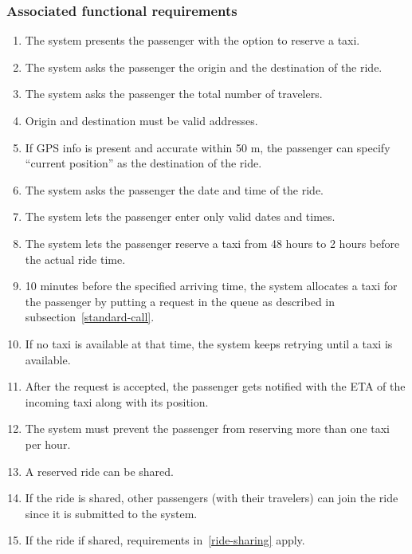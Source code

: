 \subsubsection{Associated functional requirements}
\begin{enumerate}
	\item The system presents the passenger with the option to reserve a taxi.
	\item The system asks the passenger the origin and the destination of the ride.
	\item The system asks the passenger the total number of travelers.
	\item Origin and destination must be valid addresses.
	\item If GPS info is present and accurate within 50 m, the passenger can specify ``current position'' as the destination of the ride.
	\item The system asks the passenger the date and time of the ride.
	\item The system lets the passenger enter only valid dates and times.
	\item The system lets the passenger reserve a taxi from 48 hours to 2 hours before the actual ride time.
	\item 10 minutes before the specified arriving time, the system allocates a taxi for the passenger by putting a request in the queue as described in subsection~\ref{standard-call}.
	\item If no taxi is available at that time, the system keeps retrying until a taxi is available.
	\item After the request is accepted, the passenger gets notified with the ETA of the incoming taxi along with its position.
	\item The system must prevent the passenger from reserving more than one taxi per hour.
	\item A reserved ride can be shared.
	\item If the ride is shared, other passengers (with their travelers) can join the ride since it is submitted to the system.
	\item If the ride if shared, requirements in~\autoref{ride-sharing} apply.
\end{enumerate}

